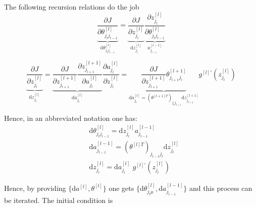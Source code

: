 \documentclass[a4paper,11pt]{article}
\newcommand{\dd}{\text{d}}
\newcommand{\na}[2]{a_{#1}^{[#2]}}
\newcommand{\nz}[2]{z_{#1}^{[#2]}}
\newcommand{\nt}[3]{\theta_{#1 #2}^{[#3]}}
\begin{document}
%
%

The following recursion relations do the job
\begin{equation}
    \underbrace{
    \frac{\partial J }{\partial  \nt{j_l}{j_{l-1}}{l}  }
    }_{\dd  \nt{j_l}{j_{l-1}}{l} } 
   =
   \underbrace{
    \frac{\partial J  }{\partial \nz{j_l}{l} }
    }_{\dd  \nz{j_{l}}{l} }
    \underbrace{
    \frac{\partial \nz{j_l}{l} }{\partial \nt{j_l}{j_{l-1}}{l}  }
    }_{ \na{j_{l-1}}{l-1} }
\end{equation}



\begin{equation}
\underbrace{
\frac{\partial J  }{\partial \nz{j_l}{l}   }
}_{\dd  \nz{j_{l}}{l} }
	=
	\underbrace{ 
	\frac{\partial J  }{\partial \nz{j_{l+1}}{l+1}   } 
	\frac{\partial \nz{j_{l+1}}{l+1}   }{ \partial \na{j_{l}}{l}  }
	}_{\dd a_{j_l}^{[l]} }
	\frac{\partial \na{j_{l}}{l}    }{ \partial \nz{j_{l}}{l}  }
	=
	\underbrace{
	\frac{\partial J  }{\partial \nz{j_{l+1}}{l+1}   } 
	 \nt{j_{l+1}}{j_l}{l+1}
	 }_{ \dd a_{j_l}^{[l]}=(\theta^{[l+1]T})_{j_l j_{l+1}} \dd z_{j_{l+1}}^{[l+1]} }
	 g^{[l]'}\left( z_{j_{l}}^{[l]}   \right)
\end{equation}

Hence, in an abbreviated notation one has:
\begin{eqnarray}
	&\dd  \nt{j_l}{j_{l-1}}{l} = \dd  \nz{j_{l}}{l}  \na{j_{l-1}}{l-1}\\
	&\dd a_{j_{l-1}}^{[l-1]}=(\theta^{[l]T})_{j_{l-1} j_{l}} \dd z_{j_{l}}^{[l]}\\
	&\dd  \nz{j_{l}}{l}= \dd a_{j_l}^{[l]} \,\, g^{[l]'}\left( z_{j_{l}}^{[l]}   \right)
\end{eqnarray}

Hence, by providing $\{ \dd a^{[l]}  , \theta^{[l]}\}$ one gets $\{ \dd  \nt{j_l}{\mu}{l}, \dd a_{j_{l-1}}^{[l-1]}\}$ and this process can be iterated. 
The initial condition is
\end{document}
